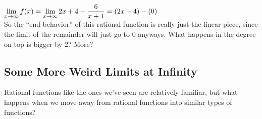 $\displaystyle \lim_{x\to\infty} f(x) = \displaystyle \lim_{x\to\infty} 2x+4- \dfrac{6}{x+1} = (2x+4)-(0)$\\

So the ``end behavior'' of this rational function is really just the linear piece, since the limit of the remainder will just go to 0 anyways. What happens in the degree on top is bigger by 2? More?

\subsection*{Some More Weird Limits at Infinity}

Rational functions like the ones we've seen are relatively familiar, but what happens when we move away from rational functions into similar types of functions?\\

